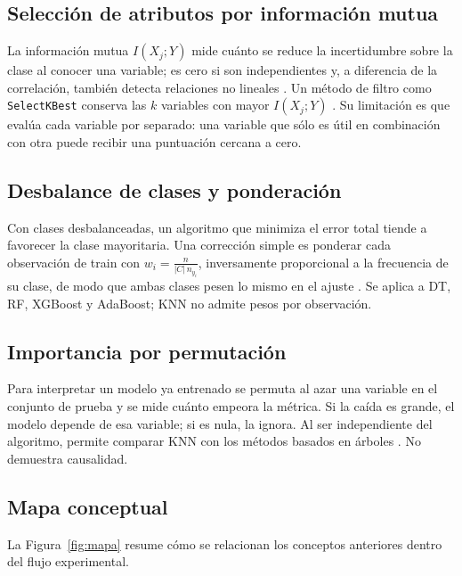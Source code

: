 \documentclass[11pt]{article}
\begin{document}
\subsection{Selección de atributos por información mutua}
La información mutua $I(X_j;Y)$ mide cuánto se reduce la incertidumbre sobre la clase
al conocer una variable; es cero si son independientes y, a diferencia de la
correlación, también detecta relaciones no lineales \cite{kraskov,ross}. Un método de
filtro como \texttt{SelectKBest} conserva las $k$ variables con mayor $I(X_j;Y)$
\cite{guyon}. Su limitación es que evalúa cada variable por separado: una variable que
sólo es útil en combinación con otra puede recibir una puntuación cercana a cero.

\subsection{Desbalance de clases y ponderación}
Con clases desbalanceadas, un algoritmo que minimiza el error total tiende a favorecer
la clase mayoritaria. Una corrección simple es ponderar cada observación de train con
$w_i=\frac{n}{|C|\,n_{y_i}}$, inversamente proporcional a la frecuencia de su clase,
de modo que ambas clases pesen lo mismo en el ajuste \cite{hegarcia}. Se aplica a DT, RF,
XGBoost y AdaBoost; KNN no admite pesos por observación.

\subsection{Importancia por permutación}
Para interpretar un modelo ya entrenado se permuta al azar una variable en el conjunto
de prueba y se mide cuánto empeora la métrica. Si la caída es grande, el modelo
depende de esa variable; si es nula, la ignora. Al ser independiente del algoritmo,
permite comparar KNN con los métodos basados en árboles \cite{breiman,sklearnperm}.
No demuestra causalidad.

\subsection{Mapa conceptual}
La Figura~\ref{fig:mapa} resume cómo se relacionan los conceptos anteriores dentro del
flujo experimental.
\end{document}
